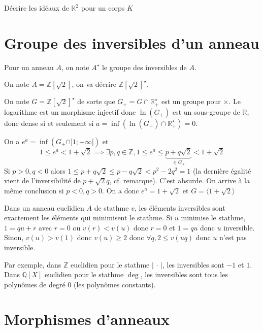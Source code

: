 \begin{exo}
    Décrire les idéaux de $\mathbb K^2$ pour un corps $K$
\end{exo}

\section{Groupe des inversibles d'un anneau}

Pour un anneau $A$, on note $A^\star$ le groupe des inversibles de $A$.

\begin{ex}
    On note $A=\mathbb Z[\sqrt 2]$, on va décrire $\mathbb Z[\sqrt 2]^\star$.

    On note $G=\mathbb Z[\sqrt 2]^\star$ de sorte que $G_+=G\cap \mathbb R_+^\star$ est un groupe pour $\times$. Le logarithme est un morphisme injectif donc $\ln(G_+)$ est un sous-groupe de $\mathbb R$, donc dense si et seulement si $a=\inf (\ln(G_+)\cap \mathbb R_+^\star)=0$.

    On a $e^a=\inf(G_+\cap ]1; +\infty[)$ et \[
        1\leq e^a< 1+\sqrt 2 \implies \exists p,q \in \mathbb Z, 1\leq e^a\leq \underbrace{p+q\sqrt 2}_{\in G_+}< 1+\sqrt 2
    \]
    Si $p>0, q<0$ alors $1\leq p+q\sqrt 2\leq p-q\sqrt 2<p^2-2q^2=1$ (la dernière égalité vient de l'inversibilité de $p+\sqrt2 q$, cf. remarque). C'est absurde. On arrive à la même conclusion si $p<0, q>0$. On a donc $e^a=1+\sqrt 2$ et $G=\langle 1+\sqrt 2 \rangle$
\end{ex}

\begin{rem}
    Dans un anneau euclidien $A$ de stathme $v$, les éléments inversibles sont exactement les éléments qui minimisent le stathme. Si $u$ minimise le stathme, $1=qu+r$ avec $r=0$ ou $v(r)<v(u)$ donc $r=0$ et $1=qu$ donc $u$ inversible. Sinon, $v(u)>v(1)$ donc $v(u)\geq 2$ donc $\forall q, 2\leq v(uq)$ donc $u$ n'est pas inversible.

    Par exemple, dans $\mathbb Z$ euclidien pour le stathme $|\,\cdot\,|$, les inversibles sont $-1$ et $1$. Dans $\mathbb Q[X]$ euclidien pour le stathme $\deg$, les inversibles sont tous les polynômes de degré $0$ (les polynômes constants).
\end{rem}

\section{Morphismes d'anneaux}

